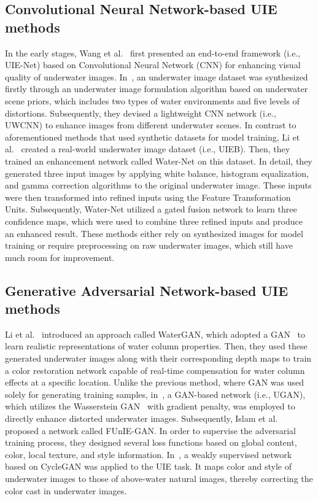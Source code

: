 \documentclass[runningheads]{llncs}
\begin{document}
\subsection{Convolutional Neural Network-based UIE methods}

In the early stages, Wang et al.~\cite{wang2017deep} first presented an end-to-end framework (i.e., UIE-Net) based on Convolutional Neural Network (CNN) for enhancing visual quality of underwater images. In~\cite{li2020underwater}, an underwater image dataset was synthesized firstly through an underwater image formulation algorithm based on underwater scene priors, which includes two types of water environments and five levels of distortions. Subsequently, they devised a lightweight CNN network (i.e., UWCNN) to enhance images from different underwater scenes. In contrast to aforementioned methods that used synthetic datasets for model training, Li et al.~\cite{li2019underwater} created a real-world underwater image dataset (i.e., UIEB). Then, they trained an enhancement network called Water-Net on this dataset. In detail, they generated three input images by applying white balance, histogram equalization, and gamma correction algorithms to the original underwater image. These inputs were then transformed into refined inputs using the Feature Transformation Units. Subsequently, Water-Net utilized a gated fusion network to learn three confidence maps, which were used to combine three refined inputs and produce an enhanced result. These methods either rely on synthesized images for model training or require preprocessing on raw underwater images, which still have much room for improvement.

\subsection{Generative Adversarial Network-based UIE methods}

Li et al.~\cite{li2017watergan} introduced an approach called WaterGAN, which adopted a GAN~\cite{goodfellow2020generative} to learn realistic representations of water column properties. Then, they used these generated underwater images along with their corresponding depth maps to train a color restoration network capable of real-time compensation for water column effects at a specific location. Unlike the previous method, where GAN was used solely for generating training samples, in~\cite{fabbri2018enhancing}, a GAN-based network (i.e., UGAN), which utilizes the Wasserstein GAN~\cite{arjovsky2017wasserstein} with gradient penalty, was employed to directly enhance distorted underwater images. Subsequently, Islam et al.~\cite{islam2020fast} proposed a network called FUnIE-GAN. In order to supervise the adversarial training process, they designed several loss functions based on global content, color, local texture, and style information. In~\cite{li2018emerging}, a weakly supervised network based on CycleGAN was applied to the UIE task. It maps color and style of underwater images to those of above-water natural images, thereby correcting the color cast in underwater images.
\end{document}
